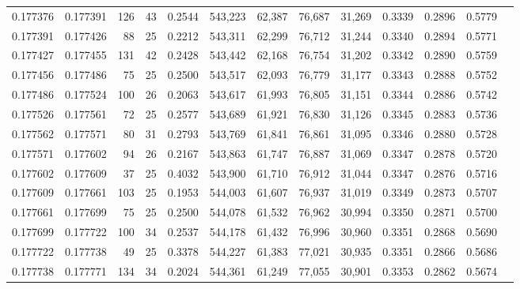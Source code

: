 \begin{tabular}{rrrrrrrrrrrrr}
0.177376 & 0.177391 & 126 &  43 &                                     0.2544 & 543,223 &  62,387 &  76,687 &  31,269 & 0.3339 & 0.2896 & 0.5779 \\
0.177391 & 0.177426 &  88 &  25 &                                     0.2212 & 543,311 &  62,299 &  76,712 &  31,244 & 0.3340 & 0.2894 & 0.5771 \\
0.177427 & 0.177455 & 131 &  42 &                                     0.2428 & 543,442 &  62,168 &  76,754 &  31,202 & 0.3342 & 0.2890 & 0.5759 \\
0.177456 & 0.177486 &  75 &  25 &                                     0.2500 & 543,517 &  62,093 &  76,779 &  31,177 & 0.3343 & 0.2888 & 0.5752 \\
0.177486 & 0.177524 & 100 &  26 &                                     0.2063 & 543,617 &  61,993 &  76,805 &  31,151 & 0.3344 & 0.2886 & 0.5742 \\
0.177526 & 0.177561 &  72 &  25 &                                     0.2577 & 543,689 &  61,921 &  76,830 &  31,126 & 0.3345 & 0.2883 & 0.5736 \\
0.177562 & 0.177571 &  80 &  31 &                                     0.2793 & 543,769 &  61,841 &  76,861 &  31,095 & 0.3346 & 0.2880 & 0.5728 \\
0.177571 & 0.177602 &  94 &  26 &                                     0.2167 & 543,863 &  61,747 &  76,887 &  31,069 & 0.3347 & 0.2878 & 0.5720 \\
0.177602 & 0.177609 &  37 &  25 &                                     0.4032 & 543,900 &  61,710 &  76,912 &  31,044 & 0.3347 & 0.2876 & 0.5716 \\
0.177609 & 0.177661 & 103 &  25 &                                     0.1953 & 544,003 &  61,607 &  76,937 &  31,019 & 0.3349 & 0.2873 & 0.5707 \\
0.177661 & 0.177699 &  75 &  25 &                                     0.2500 & 544,078 &  61,532 &  76,962 &  30,994 & 0.3350 & 0.2871 & 0.5700 \\
0.177699 & 0.177722 & 100 &  34 &                                     0.2537 & 544,178 &  61,432 &  76,996 &  30,960 & 0.3351 & 0.2868 & 0.5690 \\
0.177722 & 0.177738 &  49 &  25 &                                     0.3378 & 544,227 &  61,383 &  77,021 &  30,935 & 0.3351 & 0.2866 & 0.5686 \\
0.177738 & 0.177771 & 134 &  34 &                                     0.2024 & 544,361 &  61,249 &  77,055 &  30,901 & 0.3353 & 0.2862 & 0.5674 \\

\end{tabular}
